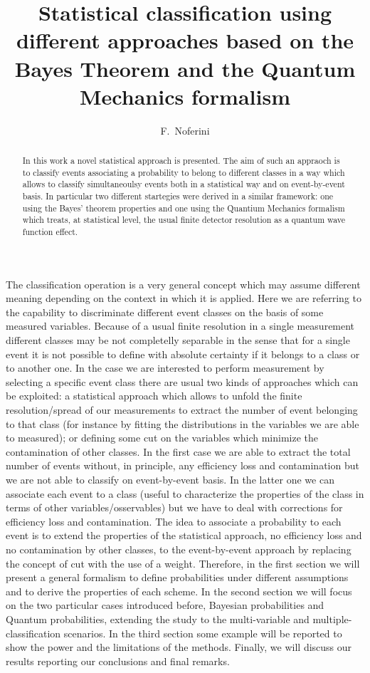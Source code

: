 \documentclass{cimento}
\title{Statistical classification using different approaches based on the Bayes Theorem and the Quantum Mechanics formalism}
\author{F.~Noferini\from{ins:centrofermi}\from{ins:infn}}
\begin{document}
\maketitle                            
\begin{abstract}
In this work a novel statistical approach is presented.
The aim of such an appraoch is to classify events associating a probability to belong to different classes in a way
which allows to classify simultaneoulsy events both in a statistical way and on event-by-event basis.
In particular two different startegies were derived in a similar framework: one using the Bayes' theorem properties
and one using the Quantium Mechanics formalism which treats, at statistical level, the usual finite detector resolution as a quantum
wave function effect.
\end{abstract}



The classification operation is a very general concept which may assume different meaning depending on the context in which
it is applied.
Here we are referring to the capability to discriminate different event classes on the basis of some
measured variables.
Because of a usual finite resolution in a single measurement different classes may be not completelly separable
in the sense that for a single event it is not possible to define with absolute certainty if it belongs to a class
or to another one.
In the case we are interested to perform measurement by selecting a specific event class there are usual two kinds of
approaches which can be exploited: a statistical approach which allows to unfold the finite resolution/spread of our
measurements to extract the number of event belonging to that class (for instance by fitting the distributions in the
variables we are able to measured); or defining some cut on the variables which minimize the contamination of other classes.
In the first case we are able to extract the total number of events without, in principle, any efficiency loss and
contamination but we are not able to classify on event-by-event basis.
In the latter one we can associate each event to a class (useful to characterize the properties of the class in terms of
other variables/osservables) but we have to deal with corrections for efficiency loss and contamination.
The idea to associate a probability to each event is to extend the properties of the statistical approach, no
efficiency loss and no contamination by other classes, to the event-by-event approach by replacing the concept
of cut with the use of a  weight.
Therefore, in the first section we will present a general formalism to define probabilities under different assumptions
and to derive the properties of each scheme.
In the second section we will focus on the two particular cases introduced before, Bayesian probabilities and Quantum probabilities,
extending the study to the multi-variable and multiple-classification scenarios.
In the third section some example will be reported to show the power and the limitations of the methods.
Finally, we will discuss our results reporting our conclusions and final remarks.
\end{document}
